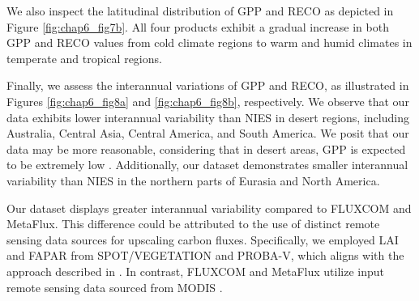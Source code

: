 We also inspect the latitudinal distribution of GPP and RECO as depicted in Figure \ref{fig:chap6_fig7b}. All four products exhibit a gradual increase in both GPP and RECO values from cold climate regions to warm and humid climates in temperate and tropical regions. \par
{}
Finally, we assess the interannual variations of GPP and RECO, as illustrated in Figures \ref{fig:chap6_fig8a} and \ref{fig:chap6_fig8b}, respectively. We observe that our data exhibits lower interannual variability than NIES in desert regions, including Australia, Central Asia, Central America, and South America. We posit that our data may be more reasonable, considering that in desert areas, GPP is expected to be extremely low \citep{hadley1981productivity}. Additionally, our dataset demonstrates smaller interannual variability than NIES in the northern parts of Eurasia and North America. \par
Our dataset displays greater interannual variability compared to FLUXCOM and MetaFlux. This difference could be attributed to the use of distinct remote sensing data sources for upscaling carbon fluxes. Specifically, we employed LAI and FAPAR from SPOT/VEGETATION and PROBA-V, which aligns with the approach described in \citep{zeng2020global}. In contrast, FLUXCOM and MetaFlux utilize input remote sensing data sourced from MODIS \citep{jung2019fluxcom, nathaniel2023metaflux}. \par
